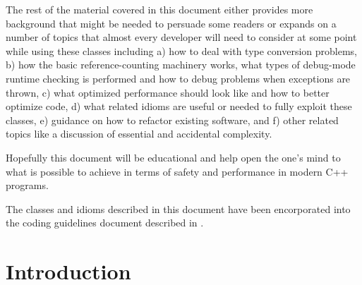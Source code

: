 \documentclass[pdf,ps2pdf,11pt]{SANDreport}
\begin{document}
The rest of the material covered in this document either provides more
background that might be needed to persuade some readers or expands on
a number of topics that almost every developer will need to consider
at some point while using these classes including a) how to deal with
type conversion problems, b) how the basic reference-counting
machinery works, what types of debug-mode runtime checking is
performed and how to debug problems when exceptions are thrown, c)
what optimized performance should look like and how to better optimize
code, d) what related idioms are useful or needed to fully exploit
these classes, e) guidance on how to refactor existing software, and
f) other related topics like a discussion of essential and accidental
complexity.

Hopefully this document will be educational and help open the one's
mind to what is possible to achieve in terms of safety and performance
in modern C++ programs.

The classes and idioms described in this document have been
encorporated into the coding guidelines document described in
{}\cite{ThyraCodingGuidelinesSAND}.



%

\SANDmain %


%
\section{Introduction}
\label{sec:intro}
%

\end{document}
